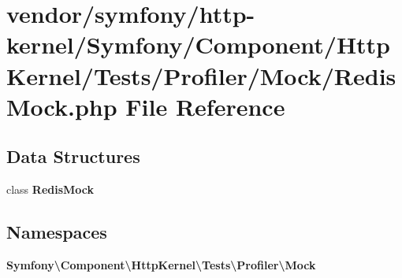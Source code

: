 \section{vendor/symfony/http-\/kernel/\+Symfony/\+Component/\+Http\+Kernel/\+Tests/\+Profiler/\+Mock/\+Redis\+Mock.php File Reference}
\label{_redis_mock_8php}
\subsection*{Data Structures}
\begin{DoxyCompactItemize}
\item 
class {\bf Redis\+Mock}
\end{DoxyCompactItemize}
\subsection*{Namespaces}
\begin{DoxyCompactItemize}
\item 
 {\bf Symfony\textbackslash{}\+Component\textbackslash{}\+Http\+Kernel\textbackslash{}\+Tests\textbackslash{}\+Profiler\textbackslash{}\+Mock}
\end{DoxyCompactItemize}

